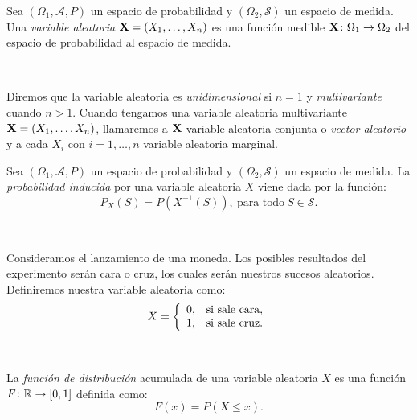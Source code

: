 \documentclass[oneside,openright,titlepage,numbers=noenddot,openany,headinclude,footinclude=true,
cleardoublepage=empty,abstractoff,BCOR=5mm,paper=a4,fontsize=12pt,main=spanish]{scrreprt}
\begin{document}
\begin{definition}
Sea $(\Omega_1, \mathcal{A},P)$ un espacio de probabilidad y $(\Omega_2, \mathcal{S})$ un espacio de medida. Una \textit{variable aleatoria} $\textbf{X}=(X_1,\dots,X_n)$ es una función medible $\textbf{X}\colon \Omega_1 \to \Omega_2$ del espacio de probabilidad al espacio de medida.
\end{definition}\

Diremos que la variable aleatoria es \textit{unidimensional} si $n=1$ y \textit{multivariante} cuando $n > 1$. Cuando tengamos una variable aleatoria multivariante $\textbf{X}=(X_1,\dots,X_n)$, llamaremos a $\textbf{X}$ variable aleatoria conjunta o \textit{vector aleatorio} y a cada $X_i$ con $i=1,\dots,n$ variable aleatoria marginal.\\


\begin{definition}
Sea $(\Omega_1, \mathcal{A},P)$ un espacio de probabilidad y $(\Omega_2, \mathcal{S})$ un espacio de medida. La \textit{probabilidad inducida} por una variable aleatoria $X$ viene dada por la función: $$P_X(S)=P(X^{-1}(S)), \ \text{para todo} \ S \in \mathcal{S}.$$
\end{definition}\

\begin{example}
Consideramos el lanzamiento de una moneda. Los posibles resultados del experimento serán cara o cruz, los cuales serán nuestros sucesos aleatorios. Definiremos nuestra variable aleatoria como: $$X= \left \{
\begin{array}{l l}
0, & \mbox{si sale cara}, \\
1, & \mbox{si sale cruz}.
\end{array}
\right.$$
\end{example}\

\begin{definition}
La \textit{función de distribución} acumulada de una variable aleatoria $X$ es una función $F\colon \mathbb{R}\to [0,1]$ definida como: $$F(x)=P(X\leq x).$$
\end{definition}\
\end{document}
